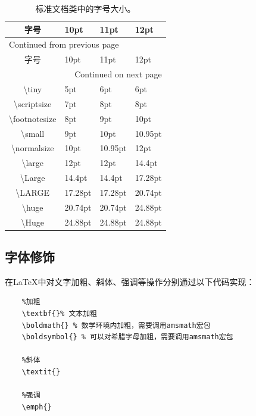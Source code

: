 \documentclass[12pt]{book}
\begin{document}
\begin{longtable}{|c|m{4.5cm}<{\centering}|m{3.5cm}<{\centering}|m{2.5cm}<{\centering}|}
    \caption{\label{absolute-font}标准文档类中的字号大小。}
    \\
    \hline
    字号 & 10pt & 11pt & 12pt\\
    \hline
    \endfirsthead
    \multicolumn{4}{l}{Continued from previous page} \\
    \hline
    
    字号 & 10pt & 11pt & 12pt \\
    
    \hline
    \endhead
    \hline\multicolumn{4}{r}{Continued on next page} \\
    \endfoot
    \endlastfoot
    \hline
    \textbackslash tiny & 5pt & 6pt & 6pt\\
    \hline
    \textbackslash scriptsize & 7pt & 8pt & 8pt\\
    \hline
    \textbackslash footnotesize & 8pt & 9pt & 10pt\\
    \hline
    \textbackslash small & 9pt & 10pt & 10.95pt\\
    \hline
    \textbackslash normalsize & 10pt & 10.95pt & 12pt\\
    \hline
    \textbackslash large & 12pt & 12pt & 14.4pt\\
    \hline
    \textbackslash Large & 14.4pt & 14.4pt & 17.28pt\\
    \hline
    \textbackslash LARGE & 17.28pt & 17.28pt & 20.74pt\\
    \hline
    \textbackslash huge & 20.74pt & 20.74pt & 24.88pt\\
    \hline
    \textbackslash Huge & 24.88pt & 24.88pt & 24.88pt\\
    \hline
\end{longtable}

\subsection{字体修饰}


在\LaTeX{}中对文字加粗、斜体、强调等操作分别通过以下代码实现：

\begin{verbatim}
    %加粗
    \textbf{}% 文本加粗
    \boldmath{} % 数学环境内加粗，需要调用amsmath宏包
    \boldsymbol{} % 可以对希腊字母加粗，需要调用amsmath宏包
    
    %斜体
    \textit{}
    
    %强调
    \emph{}
\end{verbatim}
\end{document}
